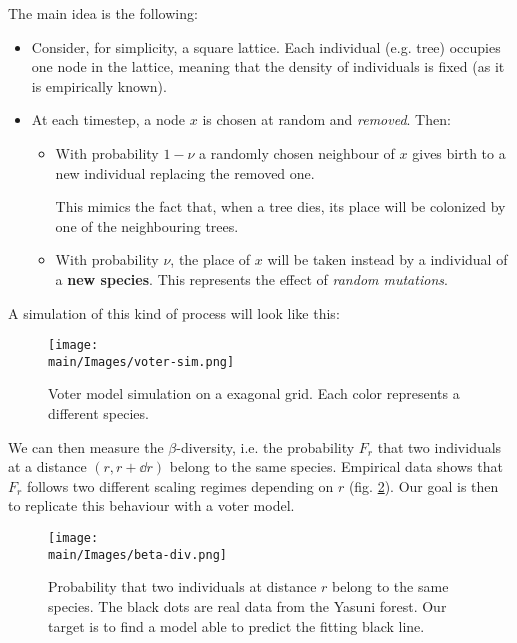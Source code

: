 \documentclass[../../main.tex]{subfiles}
\begin{document}
The main idea is the following:
\begin{itemize}
    \item Consider, for simplicity, a square lattice. Each individual (e.g. tree) occupies one node in the lattice, meaning that the density of individuals is fixed (as it is empirically known).
    \item At each timestep, a node $x$ is chosen at random and \textit{removed}. Then:
    \begin{itemize}
        \item With probability $1-\nu$ a randomly chosen neighbour of $x$ gives birth to a new individual replacing the removed one.
        
        This mimics the fact that, when a tree dies, its place will be colonized by one of the neighbouring trees.  
        \item With probability $\nu$, the place of $x$ will be taken instead by a individual of a \textbf{new species}. This represents the effect of \textit{random mutations}.  
    \end{itemize}
\end{itemize}

A simulation of this kind of process will look like this:
\begin{figure}[H]
    \centering
    \texttt{[image: \\main/Images/voter-sim.png]}
    \caption{Voter model simulation on a exagonal grid. Each color represents a different species.}
    \label{fig:voter-sim}
\end{figure}

We can then measure the $\beta$-diversity, i.e. the probability $F_r$ that two individuals at a distance $(r,r+\dd{r})$ belong to the same species. Empirical data shows that $F_r$ follows two different scaling regimes depending on $r$ (fig. \ref{fig:beta-div}). Our goal is then to replicate this behaviour with a voter model.

\begin{figure}[H]
    \centering
    \texttt{[image: \\main/Images/beta-div.png]}
    \caption{Probability that two individuals at distance $r$ belong to the same species. The black dots are real data from the Yasuni forest. Our target is to find a model able to predict the fitting black line.}
    \label{fig:beta-div}
\end{figure}
\end{document}
